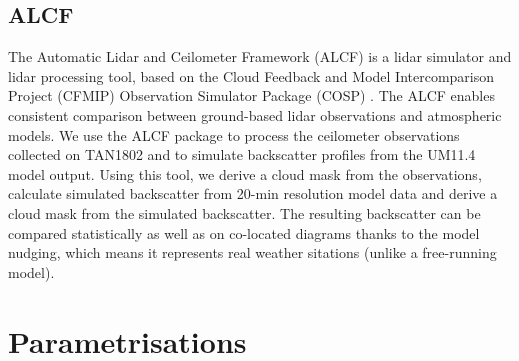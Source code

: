 \subsection{ALCF}
\label{sec:4:alcf}

The Automatic Lidar and Ceilometer Framework (ALCF) \citep{kuma2020b} is a lidar
simulator and lidar processing tool, based on the Cloud
Feedback and Model Intercomparison Project (CFMIP) Observation Simulator Package
(COSP) \citep{bodas-salcedo2011}. The ALCF enables consistent comparison
between ground-based lidar observations and atmospheric models.
We use the ALCF package to process the ceilometer
observations collected on TAN1802 and to simulate backscatter profiles from
the UM11.4 model output. Using this tool, we derive a cloud mask from
the observations, calculate simulated backscatter from 20-min resolution
model data and derive a cloud mask from the simulated backscatter.
The resulting backscatter can be compared statistically as well as on co-located
diagrams thanks to the model nudging, which means it represents real
weather sitations (unlike a free-running model).

\section{Parametrisations}
\label{sec:4:parametrisations}

\begin{table}
\caption{
Summary of the cloud-related subgrid-scale parametrisations in the UM11.4.
}
\label{tab:4:parametrisations}
\centering
{}
\end{table}



